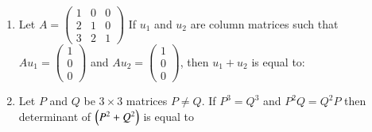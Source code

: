 \documentclass[journal,12pt,twocolumn]{IEEEtran}
\theoremstyle{remark}
\begin{document}
\begin{enumerate}
\item Let $ A = \begin{pmatrix} 1&0&0\\2&1&0\\3&2&1\end{pmatrix}$ If $u_1$ and $u_2$ are column matrices such that $Au_1 = \begin{pmatrix}1\\0\\0\end{pmatrix}$ and $Au_2 = \begin{pmatrix}1\\0\\0\end{pmatrix}$, then $u_1 + u_2$ is equal to:
	\hfill{}
        \begin{enumerate}[label={(\alph*)}]
        \end{enumerate}

	\item Let $P$ and $Q$ be $3\times3$ matrices $P\neq Q$. If $P^3=Q^3$ and $P^2Q=Q^2P$ then determinant of $\left(P^2+Q^2\right)$ is equal to
	\hfill{}
        \begin{enumerate}[label={(\alph*)}]
        \end{enumerate}


\end{enumerate}
\end{document}
